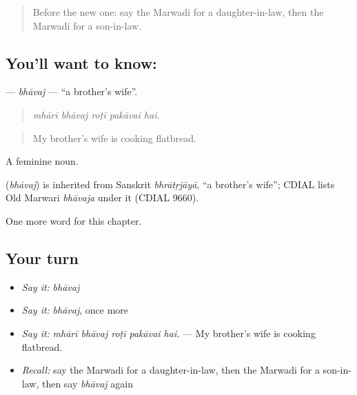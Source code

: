 \begin{quote}
Before the new one: say the Marwadi for a daughter-in-law, then the Marwadi for a son-in-law.
\end{quote}

\subsection*{You'll want to know: }
\textbf{} — \emph{bhāvaj} — \textquotedblleft{}a brother's wife\textquotedblright{}.

\begin{quote}
    
\end{quote}

\begin{quote}
\emph{mhārī bhāvaj roṭī pakāvai hai.}
\end{quote}

\begin{quote}
My brother's wife is cooking flatbread.
\end{quote}

A feminine noun.

\begin{cousinweb}
\textbf{} (\emph{bhāvaj}) is inherited from Sanskrit \emph{bhrātṛjāyā}, \textquotedblleft{}a brother's wife\textquotedblright{}; CDIAL lists Old Marwari \emph{bhāvaja} under it (CDIAL 9660).
\end{cousinweb}

\begin{grammarlens}[title={What you've built}]
One more word for this chapter.
\end{grammarlens}

\subsection*{Your turn}
\begin{itemize}
\raggedright
  \item \emph{Say it:} \emph{bhāvaj}
  \item \emph{Say it:} \emph{bhāvaj}, once more
  \item \emph{Say it:} \emph{mhārī bhāvaj roṭī pakāvai hai.} — My brother's wife is cooking flatbread.
  \item \emph{Recall:} say the Marwadi for a daughter-in-law, then the Marwadi for a son-in-law, then say \emph{bhāvaj} again
\end{itemize}

